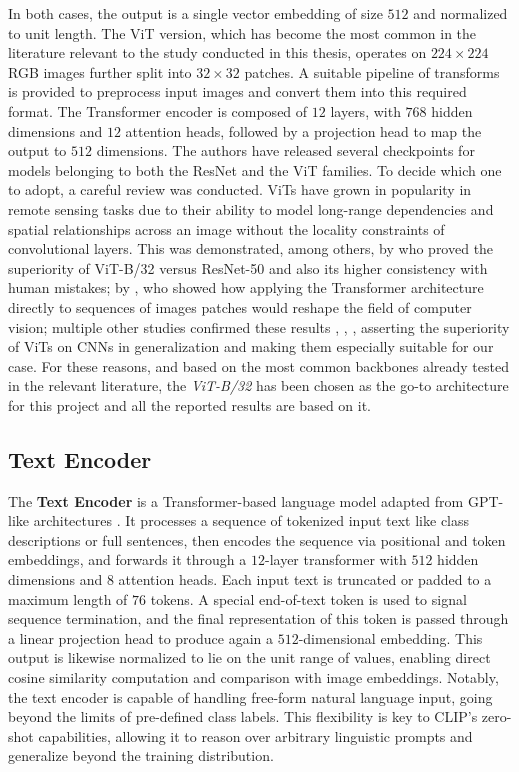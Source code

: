 \documentclass[a4paper, oneside, english]{sapthesis} %
\begin{document}
In both cases, the output is a single vector embedding of size $512$ and normalized to unit length. The ViT version, which has become the most common in the literature relevant to the study conducted in this thesis, operates on $224\times224$ RGB images further split into $32\times32$ patches. A suitable pipeline of transforms is provided to preprocess input images and convert them into this required format. The Transformer encoder is composed of $12$ layers, with $768$ hidden dimensions and $12$ attention heads, followed by a projection head to map the output to $512$ dimensions. The authors have released several checkpoints for models belonging to both the ResNet and the ViT families.
To decide which one to adopt, a careful review was conducted. ViTs have grown in popularity in remote sensing tasks due to their ability to model long-range dependencies and spatial relationships across an image without the locality constraints of convolutional layers. This was demonstrated, among others, by \cite{tuli2021convolutional} who proved the superiority of ViT-B/32 versus ResNet-50 and also its higher consistency with human mistakes; by \cite{dosovitskiy2020image}, who showed how applying the Transformer architecture directly to sequences of images patches would reshape the field of computer vision; multiple other studies confirmed these results \cite{deininger2022comparative}, \cite{hutten2022vision}, \cite{liu2024multivariate}, asserting the superiority of ViTs on CNNs in generalization and making them especially suitable for our case. For these reasons, and based on the most common backbones already tested in the relevant literature, the \emph{ViT-B/32} has been chosen as the go-to architecture for this project and all the reported results are based on it.

\subsection{Text Encoder}

The \textbf{Text Encoder} is a Transformer-based \cite{vaswani2017attention} language model adapted from GPT-like architectures \cite{radford2019language}. It processes a sequence of tokenized input text like class descriptions or full sentences, then encodes the sequence via positional and token embeddings, and forwards it through a $12$-layer transformer with $512$ hidden dimensions and $8$ attention heads. Each input text is truncated or padded to a maximum length of $76$ tokens. A special end-of-text token is used to signal sequence termination, and the final representation of this token is passed through a linear projection head to produce again a $512$-dimensional embedding. This output is likewise normalized to lie on the unit range of values, enabling direct cosine similarity computation and comparison with image embeddings.
Notably, the text encoder is capable of handling free-form natural language input, going beyond the limits of pre-defined class labels. This flexibility is key to CLIP’s zero-shot capabilities, allowing it to reason over arbitrary linguistic prompts and generalize beyond the training distribution.
\end{document}
